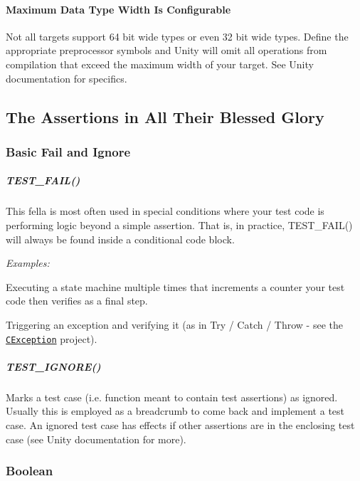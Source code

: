 \paragraph*{Maximum Data Type Width Is Configurable}

Not all targets support 64 bit wide types or even 32 bit wide types. Define the appropriate preprocessor symbols and Unity will omit all operations from compilation that exceed the maximum width of your target. See Unity documentation for specifics.

\subsection*{The Assertions in All Their Blessed Glory}

\subsubsection*{Basic Fail and Ignore}

\subparagraph*{{\ttfamily T\+E\+S\+T\+\_\+\+F\+A\+I\+L()}}

This fella is most often used in special conditions where your test code is performing logic beyond a simple assertion. That is, in practice, {\ttfamily T\+E\+S\+T\+\_\+\+F\+A\+I\+L()} will always be found inside a conditional code block.

{\itshape Examples\+:}
\begin{DoxyItemize}
\item Executing a state machine multiple times that increments a counter your test code then verifies as a final step.
\item Triggering an exception and verifying it (as in Try / Catch / Throw -\/ see the \href{https://github.com/ThrowTheSwitch/CException}{\tt C\+Exception} project).
\end{DoxyItemize}

\subparagraph*{{\ttfamily T\+E\+S\+T\+\_\+\+I\+G\+N\+O\+R\+E()}}

Marks a test case (i.\+e. function meant to contain test assertions) as ignored. Usually this is employed as a breadcrumb to come back and implement a test case. An ignored test case has effects if other assertions are in the enclosing test case (see Unity documentation for more).

\subsubsection*{Boolean}

